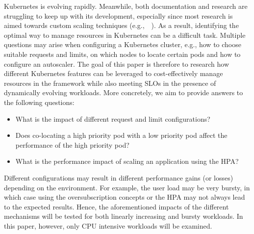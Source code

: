 Kubernetes is evolving rapidly. Meanwhile, both documentation and research are struggling to keep up with its development, especially since most research is aimed towards custom scaling techniques (e.g.,~\citep{hyscale}~\citep{caravel}). As a result, identifying the optimal way to manage resources in Kubernetes can be a difficult task. Multiple questions may arise when configuring a Kubernetes cluster, e.g., how to choose suitable requests and limits, on which nodes to locate certain pods and how to configure an autoscaler. 
The goal of this paper is therefore to research how different Kubernetes features can be leveraged to cost-effectively manage resources in the framework while also meeting SLOs in the presence of dynamically evolving workloads. More concretely, we aim to provide answers to the following questions:
\begin{itemize}
    \item What is the impact of different request and limit configurations?
    \item Does co-locating a high priority pod with a low priority pod affect the performance of the high priority pod?
    \item What is the performance impact of scaling an application using the HPA?
\end{itemize}

Different configurations may result in different performance gains (or losses) depending on the environment. For example, the user load may be very bursty, in which case using the oversubscription concepts or the HPA may not always lead to the expected results. Hence, the aforementioned impacts of the different mechanisms will be tested for both linearly increasing and bursty workloads. In this paper, however, only CPU intensive workloads will be examined. 


